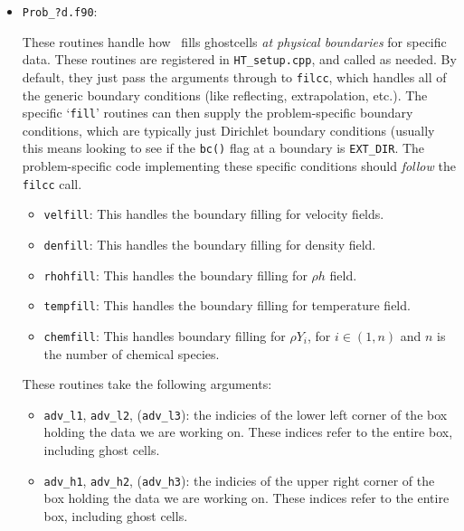 \begin{itemize}
\begin{itemize}
\begin{itemize}
    \end{itemize}
  \end{itemize}    

\item {\tt Prob\_?d.f90}:

  These routines handle how \iamr\ fills ghostcells {\em
  at physical boundaries} for specific data.
  These routines are registered in {\tt HT\_setup.cpp}, and
  called as needed.  By default, they just
  pass the arguments through to {\tt filcc}, which handles all of
  the generic boundary conditions (like reflecting, extrapolation,
  etc.).  The specific `{\tt fill}' routines can then supply the
  problem-specific boundary conditions, which are typically just
  Dirichlet boundary conditions (usually this means looking to see
  if the {\tt bc()} flag at a boundary is {\tt EXT\_DIR}.  The
  problem-specific code implementing these specific conditions
  should {\em follow} the {\tt filcc} call.
        
  \begin{itemize}
  \item {\tt velfill}:
    This handles the boundary filling for velocity fields.

  \item {\tt denfill}: 
    This handles the boundary filling for density field.

  \item {\tt rhohfill}: 
    This handles the boundary filling for $\rho h$ field.

  \item {\tt tempfill}: 
    This handles the boundary filling for temperature field.

  \item {\tt chemfill}: This handles boundary filling for
    $\rho Y_i$, for $i\in(1,n)$ and $n$ is the number of chemical species.

  \end{itemize}

  These routines take the following arguments:
  \begin{itemize}
  \item {\tt adv\_l1}, {\tt adv\_l2}, ({\tt adv\_l3}): the indicies of
    the lower left corner of the box holding the data we are working on.
    These indices refer to the entire box, including ghost cells.

  \item {\tt adv\_h1}, {\tt adv\_h2}, ({\tt adv\_h3}): the indicies of
    the upper right corner of the box holding the data we are working on.
    These indices refer to the entire box, including ghost cells.


\end{itemize}
\end{itemize}
